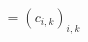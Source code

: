 \documentclass[preview]{standalone}
\begin{document}
\begin{align*}
= (c_{i,k})_{i,k}
\end{align*}
\end{document}
